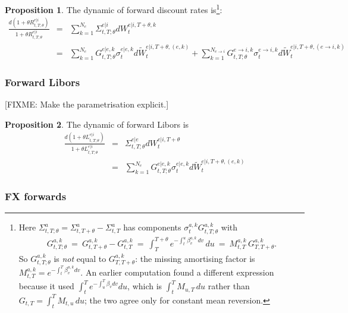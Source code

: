 \documentclass[11pt,english]{amsart}
\theoremstyle{definition}
\newtheorem{prop}{Proposition}
\begin{document}
\begin{prop}
The dynamic of forward discount rates is\footnote{Here $\Sigma^{a}_{t,T;\theta} = \Sigma^{a}_{t,T+\theta} - \Sigma^{a}_{t,T}$ has components $\sigma^{a,k}_t G^{a,k}_{t,T;\theta}$ with 
\begin{eqnarray*}
  G^{a,k}_{t,T;\theta} ~=~ G^{a,k}_{t,T+\theta} - G^{a,k}_{t,T} ~=~ \int_T^{T+\theta} e^{-\int_t^u \beta^{a,k}_v\,dv}\,du ~=~ M^{a,k}_{t,T}\, G^{a,k}_{T,T+\theta} .
\end{eqnarray*}
So $G^{a,k}_{t,T;\theta}$ is \emph{not} equal to $G^{a,k}_{T,T+\theta}$: the missing amortising factor is $M^{a,k}_{t,T} = e^{-\int_t^T\beta^{a,k}_v dv}$. An earlier computation found a different expression because it used $\int_t^T e^{-\int_u^T \beta_v dv}du$, which is $\int_t^T M_{u,T}\,du$ rather than $G_{t,T} = \int_t^T M_{t,u}\,du$; the two agree only for constant mean reversion.
}:  
\begin{eqnarray}
  \frac{d (1+\theta R^{e|i}_{t,T;\theta})}{1+\theta R^{e|i}_{t,T;\theta}}  
  &=&  \sum_{k=1}^{N_e}  \Sigma^{e|i}_{t,T;\theta} dW^{e|i,T+\theta,k}_t  \nonumber \\
  &=&  \sum_{k=1}^{N_e}  G^{e|e,k}_{t,T;\theta} \sigma^{e|e,k}_{t}   d\widetilde{W}^{e|i,T+\theta,(e,k)}_t  %
  + \sum_{k=1}^{N_{e\to i}} G^{e\to i,k}_{t,T;\theta} \sigma^{e\to i,k}_{t} d\widetilde{W}^{e|i,T+\theta,(e\to i,k)}_t 
\end{eqnarray} 
\end{prop}

\subsubsection{Forward Libors}

[FIXME: Make the parametrisation explicit.]

\begin{prop}
The dynamic of forward Libors is 
\begin{eqnarray}
  \frac{d (1+\theta L^{e|i}_{t,T;\theta})}{1+\theta L^{e|i}_{t,T;\theta}}  
  &=& \Sigma^{e|e}_{t,T;\theta} dW^{e|i,T+\theta}_t  \nonumber \\
  &=& \sum_{k=1}^{N_e}  G^{e|e,k}_{t,T;\theta} \sigma^{e|e,k}_{t}   d\widetilde{W}^{e|i,T+\theta,(e,k)}_t 
\end{eqnarray} 
\end{prop}


\subsubsection{FX forwards}
\end{document}
